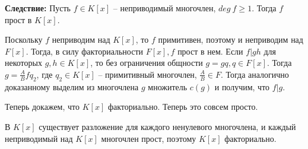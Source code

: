 \textbf{Следствие:} Пусть $f \in K[x]$ -- неприводимый многочлен, $deg \ f \geq 1$. Тогда $f$ прост в $K[x]$.

\Proof
Поскольку $f$ неприводим над $K[x]$, то $f$ примитивен, поэтому и неприводим над $F[x]$. Тогда, в силу факториальности $F[x], f$ прост в нем. Если $f|gh$ для некоторых $g, h \in K[x]$, то без ограничения общности $g = gq, q \in F[x]$. Тогда $g = \frac{A}{B}fq_2$, где $q_2 \in K[x]$ -- примитивный многочлен, $\frac{A}{B} \in F$. Тогда аналогично доказанному выделим из многочлена $g$ множитель $c(g)$ и получим, что $f|g$.
\EndProof

Теперь докажем, что $K[x]$ факториально. Теперь это совсем просто. 

В $K[x]$ существует разложение для каждого ненулевого многочлена, и каждый неприводимый над $K[x]$ многочлен прост, поэтому $K[x]$ факториально.
